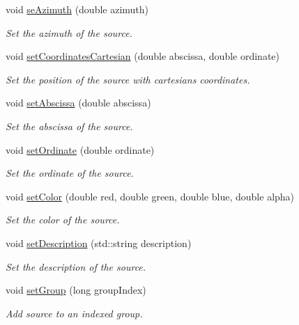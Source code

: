 \begin{DoxyCompactItemize}
void \hyperlink{class_hoa2_d_1_1_source_a255adb726b06ce0a4f639e538dd0d35e}{se\-Azimuth} (double azimuth)
\begin{DoxyCompactList}\small\item\em Set the azimuth of the source. \end{DoxyCompactList}\item 
void \hyperlink{class_hoa2_d_1_1_source_a6b618e9a6be2cdc899c89c4b877f9445}{set\-Coordinates\-Cartesian} (double abscissa, double ordinate)
\begin{DoxyCompactList}\small\item\em Set the position of the source with cartesians coordinates. \end{DoxyCompactList}\item 
void \hyperlink{class_hoa2_d_1_1_source_a5df6e0311e53adf82395883f30b84540}{set\-Abscissa} (double abscissa)
\begin{DoxyCompactList}\small\item\em Set the abscissa of the source. \end{DoxyCompactList}\item 
void \hyperlink{class_hoa2_d_1_1_source_a2674f583f6d857672449b1509efb453f}{set\-Ordinate} (double ordinate)
\begin{DoxyCompactList}\small\item\em Set the ordinate of the source. \end{DoxyCompactList}\item 
void \hyperlink{class_hoa2_d_1_1_source_ab88a3aed83fc470d7411f008ae6fd7b6}{set\-Color} (double red, double green, double blue, double alpha)
\begin{DoxyCompactList}\small\item\em Set the color of the source. \end{DoxyCompactList}\item 
void \hyperlink{class_hoa2_d_1_1_source_a104f8e689d537bd1063e6dd870261be6}{set\-Description} (std\-::string description)
\begin{DoxyCompactList}\small\item\em Set the description of the source. \end{DoxyCompactList}\item 
void \hyperlink{class_hoa2_d_1_1_source_a5c96a7bfe41bca940cc3a28056802d49}{set\-Group} (long group\-Index)
\begin{DoxyCompactList}\small\item\em Add source to an indexed group. \end{DoxyCompactList}\item 

\end{DoxyCompactItemize}
